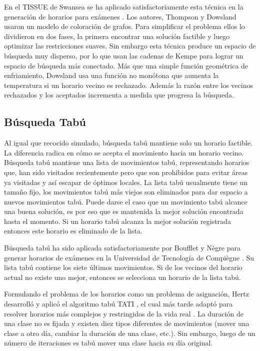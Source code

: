En el TISSUE de Swansea se ha aplicado satisfactoriamente esta t\'ecnica en la generación de horarios para exámenes
\cite{J Thompson and KA Dowsland, J Thompson and KA Dowsland 2}. Los autores, Thompson y Dowsland usaron un modelo de coloración de grafos. Para simplificar el problema ellos lo dividieron en dos fases, la primera encontrar una solución factible y luego optimizar las restricciones suaves. Sin embargo esta t\'ecnica produce un espacio de búsqueda muy disperso, por lo que usan las cadenas de Kempe para lograr un espacio de búsqueda más conectado. Más que una simple función geom\'etrica de enfriamiento, Dowsland usa una función no monótona que aumenta la temperatura si un horario vecino es rechazado. Además la razón entre los vecinos rechazados y los aceptados incrementa a medida que progresa la búsqueda.

\subsection{Búsqueda Tab\'u}

Al igual que recocido simulado, búsqueda tab\'u mantiene solo un horario factible. La diferencia radica en cómo se acepta el movimiento hacia un horario vecino. Búsqueda tab\'u mantiene una lista de movimientos tab\'u, representando horarios que, han sido visitados recientemente pero que son prohibidos para evitar \'areas ya visitadas y así escapar de óptimos locales. La lista tab\'u usualmente tiene un tamaño fijo, los movimientos tab\'u más viejos son eliminados para dar espacio a nuevos movimientos tab\'u. Puede darse el caso que un movimiento tab\'u alcance una buena solución, es por eso que es mantenida la mejor solución encontrada hasta el momento. Si un horario tab\'u alcanza la mejor solución registrada entonces este horario es eliminado de la lista.

Búsqueda tab\'u ha sido aplicada satisfactoriamente por Boufflet y N\`egre para generar horarios de exámenes en la Universidad de Tecnología de Compi\`egne \cite{JP Boufflet and S Negre}. Su lista tab\'u contiene los siete últimos movimientos. Si de los vecinos del horario actual no existe uno mejor, entonces se selecciona un horario de la lista tab\'u.

Formulando el problema de los horarios como un problema de asignación, Hertz desarrolló y aplicó el algoritmo tab\'u TATI \cite{A Hertz}, el cual más tarde adaptó para resolver horarios más complejos y restringidos de la vida real \cite{A Hertz 2}. La duración de una clase no es fijada y existen diez tipos diferentes de movimientos (mover una clase a otro día, cambiar la duración de una clase, etc.). Sin embargo, luego de un número de iteraciones es tab\'u mover una clase hacia su día original.

